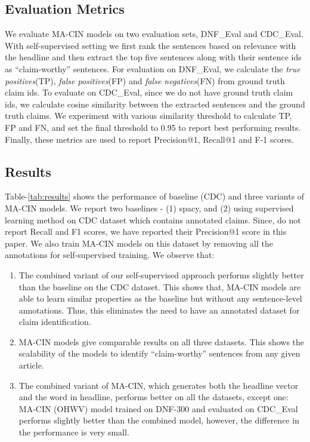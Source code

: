 \documentclass[11pt,a4paper]{article}
\begin{document}
\subsection{Evaluation Metrics}
\label{sect:eval_metrics}
We evaluate MA-CIN models on two evaluation sets, DNF\_Eval and CDC\_Eval. With self-supervised setting we first rank the sentences based on relevance with the headline and then extract the top five sentences along with their sentence ids as ``claim-worthy'' sentences. For evaluation on DNF\_Eval, we calculate the \textit{true positives}(TP), \textit{false positives}(FP) and \textit{false negatives}(FN) from ground truth claim ids. To evaluate on CDC\_Eval, since we do not have ground truth claim ids, we calculate cosine similarity between the extracted sentences and the ground truth claims. We experiment with various similarity threshold to calculate TP, FP and FN, and set the final threshold to 0.95 to report best performing results. Finally, these metrics are used to report Precision@1, Recall@1 and F-1 scores.

\subsection{Results}
\label{sect:results}
Table-\ref{tab:results} shows the performance of baseline (CDC) \citep{levy_context_2014} and three variants of MA-CIN models. We report two baselines - (1) spacy, and (2) \citet{levy_context_2014} using supervised learning method on CDC dataset which contains annotated claims. Since, \citet{levy_context_2014} do not report Recall and F1 scores, we have reported their Precision@1 score in this paper. We also train MA-CIN models on this dataset by removing all the annotations for self-supervised training. We observe that: 
\begin{enumerate}[nolistsep]
    \item The combined variant of our self-supervised approach performs slightly better than the baseline on the CDC dataset. This shows that, MA-CIN models are able to learn similar properties as the baseline but without any sentence-level annotations. Thus, this eliminates the need to have an annotated dataset for claim identification.
	\item MA-CIN models give comparable results on all three datasets. This shows the scalability of the models to identify ``claim-worthy'' sentences from any given article.
	\item The combined variant of MA-CIN, which generates both the headline vector and the word in headline, performs better on all the datasets, except one: MA-CIN (OHWV) model trained on DNF-300 and evaluated on CDC\_Eval performs slightly better than the combined model, however, the difference in the performance is very small. 
\end{enumerate}
\end{document}
